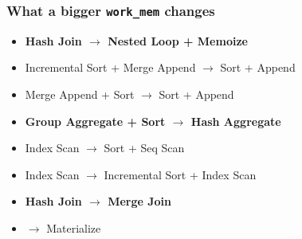 \documentclass{beamer}
\begin{document}
\begin{frame}\frametitle{What a bigger \texttt{work\_mem} changes}
\vspace*{\fill}

{\small\color{ptoink}
\begin{itemize}\itemsep6pt
  \item \textbf{Hash Join $\rightarrow$ Nested Loop + Memoize}
  \item Incremental Sort + Merge Append $\rightarrow$ Sort + Append
  \item Merge Append + Sort $\rightarrow$ Sort + Append
  \item \textbf{Group Aggregate + Sort $\rightarrow$ Hash Aggregate}
  \item Index Scan $\rightarrow$ Sort + Seq Scan
  \item Index Scan $\rightarrow$ Incremental Sort + Index Scan
  \item \textbf{Hash Join $\rightarrow$ Merge Join}
  \item $\rightarrow$ Materialize
\end{itemize}}

\vspace*{\fill}
\end{frame}
\end{document}
